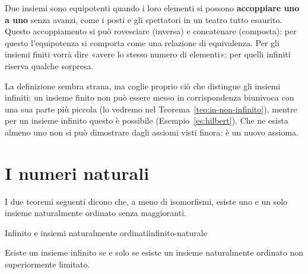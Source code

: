 \begin{spiegazione}
    Due insiemi sono equipotenti quando i loro elementi si possono \textbf{accoppiare uno a uno} senza avanzi, come i posti e gli
    spettatori in un teatro tutto esaurito. Questo accoppiamento si può rovesciare (inversa) e concatenare (composta): per questo
    l'equipotenza si comporta come una relazione di equivalenza. Per gli insiemi finiti vorrà dire «avere lo stesso numero di
    elementi»; per quelli infiniti riserva qualche sorpresa.
\end{spiegazione}


La definizione sembra strana, ma coglie proprio ciò che distingue gli insiemi infiniti: un insieme finito non può essere
messo in corrispondenza biunivoca con una sua parte più piccola (lo vedremo nel Teorema~\ref{teo:in-non-infinito}), mentre
per un insieme infinito questo è possibile (Esempio~\ref{es:hilbert}). Che ne esista almeno uno non si può dimostrare dagli
assiomi visti finora: è un nuovo assioma.


\section{I numeri naturali}\label{sec:naturali}


I due teoremi seguenti dicono che, a meno di isomorfismi, esiste uno e un solo insieme naturalmente ordinato senza maggioranti.

\begin{concetto}
\begin{Teorema}{Infinito e insiemi naturalmente ordinati}{infinito-naturale}
    \begin{prerequisiti}
    \end{prerequisiti}
    \senzadim
    Esiste un insieme infinito se e solo se esiste un insieme naturalmente ordinato non superiormente limitato.
\end{Teorema}
\end{concetto}

